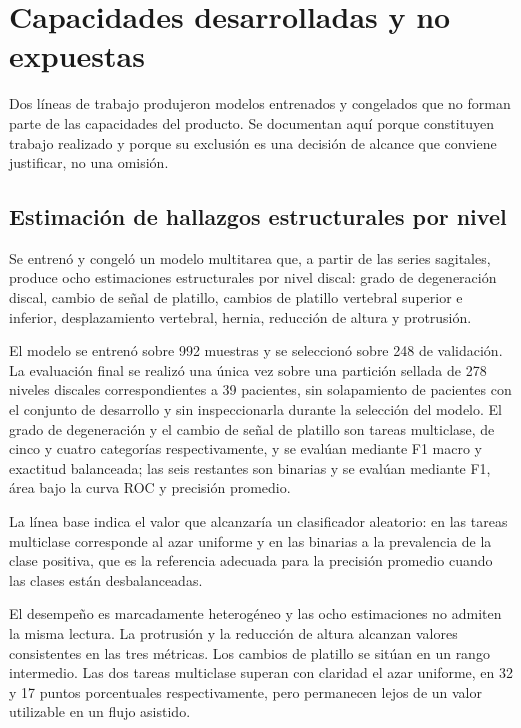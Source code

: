 \section{Capacidades desarrolladas y no expuestas}

Dos líneas de trabajo produjeron modelos entrenados y congelados que no forman parte de las capacidades del producto. Se documentan aquí porque constituyen trabajo realizado y porque su exclusión es una decisión de alcance que conviene justificar, no una omisión.

\subsection{Estimación de hallazgos estructurales por nivel}

Se entrenó y congeló un modelo multitarea que, a partir de las series sagitales, produce ocho estimaciones estructurales por nivel discal: grado de degeneración discal, cambio de señal de platillo, cambios de platillo vertebral superior e inferior, desplazamiento vertebral, hernia, reducción de altura y protrusión.

El modelo se entrenó sobre 992 muestras y se seleccionó sobre 248 de validación. La evaluación final se realizó una única vez sobre una partición sellada de 278 niveles discales correspondientes a 39 pacientes, sin solapamiento de pacientes con el conjunto de desarrollo y sin inspeccionarla durante la selección del modelo. El grado de degeneración y el cambio de señal de platillo son tareas multiclase, de cinco y cuatro categorías respectivamente, y se evalúan mediante F1 macro y exactitud balanceada; las seis restantes son binarias y se evalúan mediante F1, área bajo la curva ROC y precisión promedio.


La línea base indica el valor que alcanzaría un clasificador aleatorio: en las tareas multiclase corresponde al azar uniforme y en las binarias a la prevalencia de la clase positiva, que es la referencia adecuada para la precisión promedio cuando las clases están desbalanceadas.

El desempeño es marcadamente heterogéneo y las ocho estimaciones no admiten la misma lectura. La protrusión y la reducción de altura alcanzan valores consistentes en las tres métricas. Los cambios de platillo se sitúan en un rango intermedio. Las dos tareas multiclase superan con claridad el azar uniforme, en 32 y 17 puntos porcentuales respectivamente, pero permanecen lejos de un valor utilizable en un flujo asistido.

